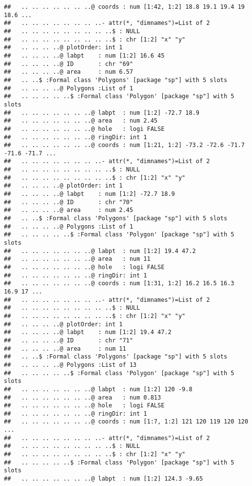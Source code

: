 \documentclass[]{article}
\begin{document}
\begin{verbatim}
##   .. .. .. .. .. .. ..@ coords : num [1:42, 1:2] 18.8 19.1 19.4 19 18.6 ...
##   .. .. .. .. .. .. .. ..- attr(*, "dimnames")=List of 2
##   .. .. .. .. .. .. .. .. ..$ : NULL
##   .. .. .. .. .. .. .. .. ..$ : chr [1:2] "x" "y"
##   .. .. .. ..@ plotOrder: int 1
##   .. .. .. ..@ labpt    : num [1:2] 16.6 45
##   .. .. .. ..@ ID       : chr "69"
##   .. .. .. ..@ area     : num 6.57
##   .. ..$ :Formal class 'Polygons' [package "sp"] with 5 slots
##   .. .. .. ..@ Polygons :List of 1
##   .. .. .. .. ..$ :Formal class 'Polygon' [package "sp"] with 5 slots
##   .. .. .. .. .. .. ..@ labpt  : num [1:2] -72.7 18.9
##   .. .. .. .. .. .. ..@ area   : num 2.45
##   .. .. .. .. .. .. ..@ hole   : logi FALSE
##   .. .. .. .. .. .. ..@ ringDir: int 1
##   .. .. .. .. .. .. ..@ coords : num [1:21, 1:2] -73.2 -72.6 -71.7 -71.6 -71.7 ...
##   .. .. .. .. .. .. .. ..- attr(*, "dimnames")=List of 2
##   .. .. .. .. .. .. .. .. ..$ : NULL
##   .. .. .. .. .. .. .. .. ..$ : chr [1:2] "x" "y"
##   .. .. .. ..@ plotOrder: int 1
##   .. .. .. ..@ labpt    : num [1:2] -72.7 18.9
##   .. .. .. ..@ ID       : chr "70"
##   .. .. .. ..@ area     : num 2.45
##   .. ..$ :Formal class 'Polygons' [package "sp"] with 5 slots
##   .. .. .. ..@ Polygons :List of 1
##   .. .. .. .. ..$ :Formal class 'Polygon' [package "sp"] with 5 slots
##   .. .. .. .. .. .. ..@ labpt  : num [1:2] 19.4 47.2
##   .. .. .. .. .. .. ..@ area   : num 11
##   .. .. .. .. .. .. ..@ hole   : logi FALSE
##   .. .. .. .. .. .. ..@ ringDir: int 1
##   .. .. .. .. .. .. ..@ coords : num [1:31, 1:2] 16.2 16.5 16.3 16.9 17 ...
##   .. .. .. .. .. .. .. ..- attr(*, "dimnames")=List of 2
##   .. .. .. .. .. .. .. .. ..$ : NULL
##   .. .. .. .. .. .. .. .. ..$ : chr [1:2] "x" "y"
##   .. .. .. ..@ plotOrder: int 1
##   .. .. .. ..@ labpt    : num [1:2] 19.4 47.2
##   .. .. .. ..@ ID       : chr "71"
##   .. .. .. ..@ area     : num 11
##   .. ..$ :Formal class 'Polygons' [package "sp"] with 5 slots
##   .. .. .. ..@ Polygons :List of 13
##   .. .. .. .. ..$ :Formal class 'Polygon' [package "sp"] with 5 slots
##   .. .. .. .. .. .. ..@ labpt  : num [1:2] 120 -9.8
##   .. .. .. .. .. .. ..@ area   : num 0.813
##   .. .. .. .. .. .. ..@ hole   : logi FALSE
##   .. .. .. .. .. .. ..@ ringDir: int 1
##   .. .. .. .. .. .. ..@ coords : num [1:7, 1:2] 121 120 119 120 120 ...
##   .. .. .. .. .. .. .. ..- attr(*, "dimnames")=List of 2
##   .. .. .. .. .. .. .. .. ..$ : NULL
##   .. .. .. .. .. .. .. .. ..$ : chr [1:2] "x" "y"
##   .. .. .. .. ..$ :Formal class 'Polygon' [package "sp"] with 5 slots
##   .. .. .. .. .. .. ..@ labpt  : num [1:2] 124.3 -9.65

\end{verbatim}
\end{document}
